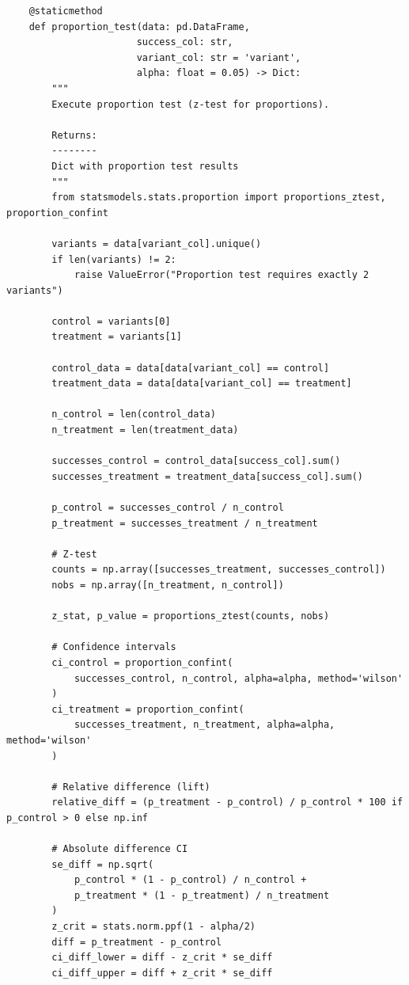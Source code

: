 \begin{lstlisting}
    @staticmethod
    def proportion_test(data: pd.DataFrame,
                       success_col: str,
                       variant_col: str = 'variant',
                       alpha: float = 0.05) -> Dict:
        """
        Execute proportion test (z-test for proportions).

        Returns:
        --------
        Dict with proportion test results
        """
        from statsmodels.stats.proportion import proportions_ztest, proportion_confint

        variants = data[variant_col].unique()
        if len(variants) != 2:
            raise ValueError("Proportion test requires exactly 2 variants")

        control = variants[0]
        treatment = variants[1]

        control_data = data[data[variant_col] == control]
        treatment_data = data[data[variant_col] == treatment]

        n_control = len(control_data)
        n_treatment = len(treatment_data)

        successes_control = control_data[success_col].sum()
        successes_treatment = treatment_data[success_col].sum()

        p_control = successes_control / n_control
        p_treatment = successes_treatment / n_treatment

        # Z-test
        counts = np.array([successes_treatment, successes_control])
        nobs = np.array([n_treatment, n_control])

        z_stat, p_value = proportions_ztest(counts, nobs)

        # Confidence intervals
        ci_control = proportion_confint(
            successes_control, n_control, alpha=alpha, method='wilson'
        )
        ci_treatment = proportion_confint(
            successes_treatment, n_treatment, alpha=alpha, method='wilson'
        )

        # Relative difference (lift)
        relative_diff = (p_treatment - p_control) / p_control * 100 if p_control > 0 else np.inf

        # Absolute difference CI
        se_diff = np.sqrt(
            p_control * (1 - p_control) / n_control +
            p_treatment * (1 - p_treatment) / n_treatment
        )
        z_crit = stats.norm.ppf(1 - alpha/2)
        diff = p_treatment - p_control
        ci_diff_lower = diff - z_crit * se_diff
        ci_diff_upper = diff + z_crit * se_diff


\end{lstlisting}
